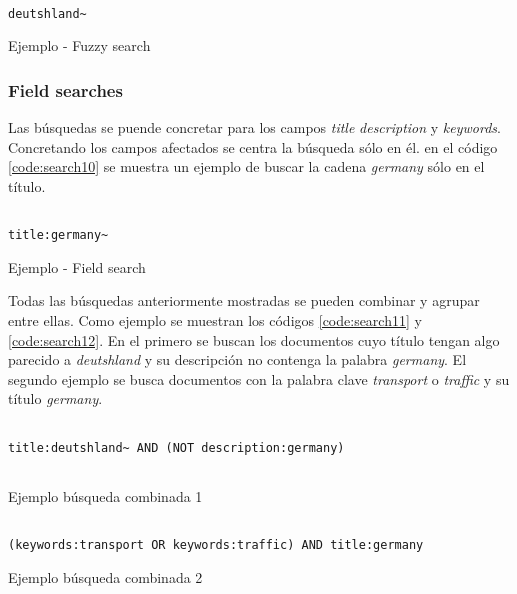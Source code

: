 \begin{listing}[H]
\begin{verbatim}
	
deutshland~
\end{verbatim}
	\caption{Ejemplo - Fuzzy search}
	\label{code:search9}
\end{listing}

\subsubsection{Field searches}
Las búsquedas se puende concretar para los campos \textit{title} \textit{description} y \textit{keywords}. Concretando los campos afectados se centra la búsqueda sólo en él. en el código \ref{code:search10} se muestra un ejemplo de buscar la cadena \textit{germany} sólo en el título.
\begin{listing}[H]
\begin{verbatim}
	
title:germany~
\end{verbatim}
	\caption{Ejemplo - Field search}
	\label{code:search10}
\end{listing}

Todas las búsquedas anteriormente mostradas se pueden combinar y agrupar entre ellas. Como ejemplo se muestran los códigos \ref{code:search11} y \ref{code:search12}. En el primero se buscan los documentos cuyo título tengan algo parecido a \textit{deutshland} y su descripción no contenga la palabra \textit{germany}. El segundo ejemplo se busca documentos con la palabra clave \textit{transport} o \textit{traffic} y su título \textit{germany}.

\begin{listing}[H]
\begin{verbatim}
               
title:deutshland~ AND (NOT description:germany) 
 
\end{verbatim}
	\caption{Ejemplo búsqueda combinada 1}
	\label{code:search11}
\end{listing}

\begin{listing}[H]
\begin{verbatim}
	
(keywords:transport OR keywords:traffic) AND title:germany
\end{verbatim}
	\caption{Ejemplo búsqueda combinada 2}
	\label{code:search12}
\end{listing}

